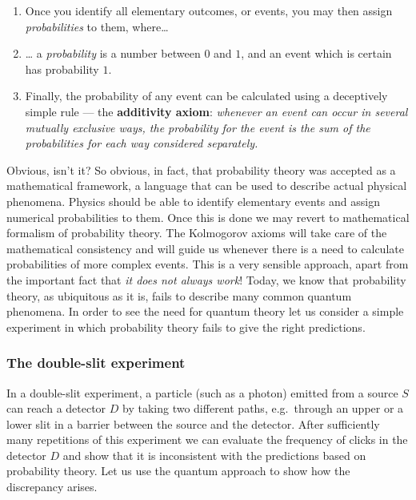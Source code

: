 \documentclass[fleqn]{article}
\providecommand{\tightlist}{%
  \setlength{\itemsep}{0pt}\setlength{\parskip}{0pt}}
\begin{document}
\begin{enumerate}
\def\labelenumi{\arabic{enumi}.}
\tightlist
\item
  Once you identify all elementary outcomes, or events, you may then assign \emph{probabilities} to them, where\ldots{}
\item
  \ldots{} a \emph{probability} is a number between \(0\) and \(1\), and an event which is certain has probability \(1\).
\item
  Finally, the probability of any event can be calculated using a deceptively simple rule --- the \textbf{additivity axiom}:
  \emph{whenever an event can occur in several mutually exclusive ways, the probability for the event is the sum of the probabilities for each way considered separately.}
\end{enumerate}

Obvious, isn't it?
So obvious, in fact, that probability theory was accepted as a mathematical framework, a language that can be used to describe actual physical phenomena.
Physics should be able to identify elementary events and assign numerical probabilities to them.
Once this is done we may revert to mathematical formalism of probability theory.
The Kolmogorov axioms will take care of the mathematical consistency and will guide us whenever there is a need to calculate probabilities of more complex events.
This is a very sensible approach, apart from the important fact that \emph{it does not always work}!
Today, we know that probability theory, as ubiquitous as it is, fails to describe many common quantum phenomena.
In order to see the need for quantum theory let us consider a simple experiment in which probability theory fails to give the right predictions.

\hypertarget{the-double-slit-experiment}{%
\subsubsection{The double-slit experiment}\label{the-double-slit-experiment}}

In a double-slit experiment, a particle (such as a photon) emitted from a source \(S\) can reach a detector \(D\) by taking two different paths, e.g.~through an upper or a lower slit in a barrier between the source and the detector.
After sufficiently many repetitions of this experiment we can evaluate the frequency of clicks in the detector \(D\) and show that it is inconsistent with the predictions based on probability theory.
Let us use the quantum approach to show how the discrepancy arises.
\end{document}
